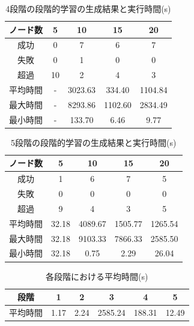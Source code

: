 \documentclass[exploratorypaper]{jsaiart} %
\begin{document}
\begin{table}[t]
\caption{4段階の段階的学習の生成結果と実行時間(s)}
\label{tbl:result2}
\begin{tabular}{c|cccc}
    ノード数&	5&	10&	15&	20\\
    \hline \hline
    成功&	0&	7&	6&	7\\
    失敗&	0&	1&	0&	0\\
    超過&	10&	2&	4&	3\\
    \hline
    平均時間&	-&	3023.63&	334.40&	1104.84\\
    最大時間&	- &	8293.86&	1102.60&	2834.49\\
    最小時間&	- &	133.70&	6.46&	9.77\\
    \hline
\end{tabular}
\end{table}

\begin{table}[t]
\caption{5段階の段階的学習の生成結果と実行時間(s)}
\label{tbl:result3}
\begin{tabular}{c|cccc}
    ノード数&	5&	10&	15&	20\\
    \hline \hline
    成功&	1&	6&	7&	5\\
    失敗&	0&	0&	0&	0\\
    超過&	9&	4&	3&	5\\
    \hline
    平均時間&	32.18&	4089.67&	1505.77&	1265.54\\
    最大時間&	32.18&	9103.33&	7866.33&	2585.50\\
    最小時間&	32.18&	0.75&	2.29&	26.04\\
    \hline
\end{tabular}
\end{table}

\begin{table}[t]
\caption{各段階における平均時間(s)}
\label{tbl:result4}
\begin{tabular}{c|ccccc}
    段階&	1&	2&	3&	4&	5\\
    \hline
    平均時間&	1.17&	2.24&	2585.24&	188.31&	12.49\\
\end{tabular}
\end{table}


\end{document}
